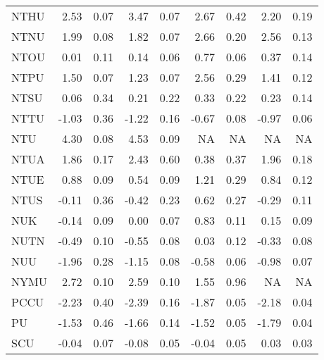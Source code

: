 \begin{longtable}[t]{lrrrrrrrr}
\hspace{1em}NTHU & 2.53 & 0.07 & 3.47 & 0.07 & 2.67 & 0.42 & 2.20 & 0.19\\
\hspace{1em}NTNU & 1.99 & 0.08 & 1.82 & 0.07 & 2.66 & 0.20 & 2.56 & 0.13\\
\hspace{1em}NTOU & 0.01 & 0.11 & 0.14 & 0.06 & 0.77 & 0.06 & 0.37 & 0.14\\
\hspace{1em}NTPU & 1.50 & 0.07 & 1.23 & 0.07 & 2.56 & 0.29 & 1.41 & 0.12\\
\hspace{1em}NTSU & 0.06 & 0.34 & 0.21 & 0.22 & 0.33 & 0.22 & 0.23 & 0.14\\
\hspace{1em}NTTU & -1.03 & 0.36 & -1.22 & 0.16 & -0.67 & 0.08 & -0.97 & 0.06\\
\hspace{1em}NTU & 4.30 & 0.08 & 4.53 & 0.09 & NA & NA & NA & NA\\
\hspace{1em}NTUA & 1.86 & 0.17 & 2.43 & 0.60 & 0.38 & 0.37 & 1.96 & 0.18\\
\hspace{1em}NTUE & 0.88 & 0.09 & 0.54 & 0.09 & 1.21 & 0.29 & 0.84 & 0.12\\
\hspace{1em}NTUS & -0.11 & 0.36 & -0.42 & 0.23 & 0.62 & 0.27 & -0.29 & 0.11\\
\hspace{1em}NUK & -0.14 & 0.09 & 0.00 & 0.07 & 0.83 & 0.11 & 0.15 & 0.09\\
\hspace{1em}NUTN & -0.49 & 0.10 & -0.55 & 0.08 & 0.03 & 0.12 & -0.33 & 0.08\\
\hspace{1em}NUU & -1.96 & 0.28 & -1.15 & 0.08 & -0.58 & 0.06 & -0.98 & 0.07\\
\hspace{1em}NYMU & 2.72 & 0.10 & 2.59 & 0.10 & 1.55 & 0.96 & NA & NA\\
\hspace{1em}PCCU & -2.23 & 0.40 & -2.39 & 0.16 & -1.87 & 0.05 & -2.18 & 0.04\\
\hspace{1em}PU & -1.53 & 0.46 & -1.66 & 0.14 & -1.52 & 0.05 & -1.79 & 0.04\\
\hspace{1em}SCU & -0.04 & 0.07 & -0.08 & 0.05 & -0.04 & 0.05 & 0.03 & 0.03\\

\end{longtable}

